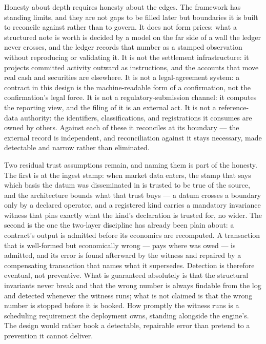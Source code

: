 Honesty about depth requires honesty about the edges. The framework has standing
limits, and they are not gaps to be filled later but boundaries it is built to
reconcile against rather than to govern. It does not form prices: what a structured
note is worth is decided by a model on the far side of a wall the ledger never
crosses, and the ledger records that number as a stamped observation without
reproducing or validating it. It is not the settlement infrastructure: it projects
committed activity outward as instructions, and the accounts that move real cash and
securities are elsewhere. It is not a legal-agreement system: a contract in this
design is the machine-readable form of a confirmation, not the confirmation's legal
force. It is not a regulatory-submission channel: it computes the reporting view, and
the filing of it is an external act. It is not a reference-data authority: the
identifiers, classifications, and registrations it consumes are owned by others.
Against each of these it reconciles at its boundary --- the external record is
independent, and reconciliation against it stays necessary, made detectable and
narrow rather than eliminated.

Two residual trust assumptions remain, and naming them is part of the honesty. The
first is at the ingest stamp: when market data enters, the stamp that says which
basis the datum was disseminated in is trusted to be true of the source, and the
architecture bounds what that trust buys --- a datum crosses a boundary only by a
declared operator, and a registered kind carries a mandatory invariance witness that
pins exactly what the kind's declaration is trusted for, no wider. The second is the
one the two-layer discipline has already been plain about: a contract's output is
admitted before its economics are recomputed. A transaction that is well-formed but
economically wrong --- pays  where  was owed --- is admitted, and
its error is found afterward by the witness and repaired by a compensating
transaction that names what it supersedes. Detection is therefore eventual, not
preventive. What is guaranteed absolutely is that the structural invariants never
break and that the wrong number is always findable from the log and detected whenever
the witness runs; what is not claimed is that the wrong number is stopped before it is
booked. How promptly the witness runs is a scheduling requirement the deployment owns,
standing alongside the engine's. The design would rather book a detectable, repairable
error than pretend to a prevention it cannot deliver.
